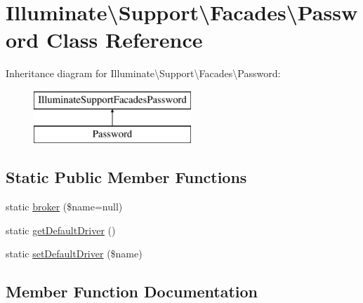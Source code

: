 \hypertarget{class_illuminate_1_1_support_1_1_facades_1_1_password}{}\section{Illuminate\textbackslash{}Support\textbackslash{}Facades\textbackslash{}Password Class Reference}
\label{class_illuminate_1_1_support_1_1_facades_1_1_password}
Inheritance diagram for Illuminate\textbackslash{}Support\textbackslash{}Facades\textbackslash{}Password\+:\begin{figure}[H]
\begin{center}
\leavevmode
\includegraphics[height=2.000000cm]{class_illuminate_1_1_support_1_1_facades_1_1_password}
\end{center}
\end{figure}
\subsection*{Static Public Member Functions}
\begin{DoxyCompactItemize}
\item 
static \mbox{\hyperlink{class_illuminate_1_1_support_1_1_facades_1_1_password_a2ab3d512f33afab7e4a6d30451b73004}{broker}} (\$name=null)
\item 
static \mbox{\hyperlink{class_illuminate_1_1_support_1_1_facades_1_1_password_af71d4c568356b6fc983c3afc99687a10}{get\+Default\+Driver}} ()
\item 
static \mbox{\hyperlink{class_illuminate_1_1_support_1_1_facades_1_1_password_ae2ba5566739028f4836fed084f77daa1}{set\+Default\+Driver}} (\$name)
\end{DoxyCompactItemize}


\subsection{Member Function Documentation}
\mbox{\label{class_illuminate_1_1_support_1_1_facades_1_1_password_a2ab3d512f33afab7e4a6d30451b73004}} 
